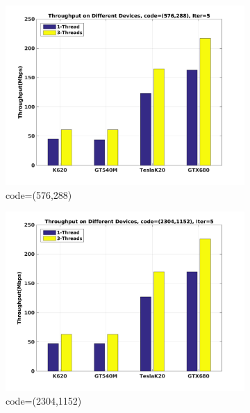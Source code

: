 \documentclass[10pt,a4paper]{article}
\begin{document}
\begin{figure}[H]
  \begin{subfigure}[b]{0.6\textwidth}
    \includegraphics[width=\textwidth]{c_576_5.jpg}
    \caption{code=(576,288)}
    \label{fig:throu_5_a}
  \end{subfigure}
  \begin{subfigure}[b]{0.6\textwidth}
    \includegraphics[width=\textwidth]{c_2304_5.jpg}
    \caption{code=(2304,1152)}
    \label{fig:throu_5_b}
  \end{subfigure}
  \\
    \begin{subfigure}[b]{0.7\textwidth}

\end{subfigure}
\end{figure}
\end{document}
